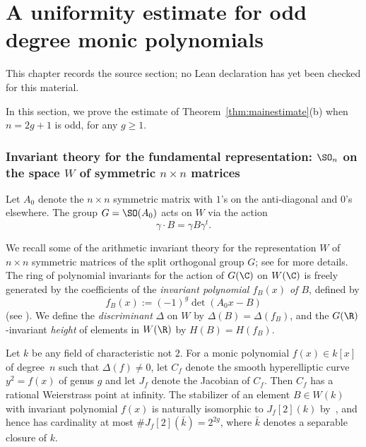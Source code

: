 \chapter{A uniformity estimate for odd degree monic polynomials}
\label{squarefree-values-polynomial-discriminants-chapter-02}

\begin{remark}
\label{squarefree-values-polynomial-discriminants-chapter-02-source}
This chapter records the source section; no Lean declaration has yet been checked for this material.
\notready
\end{remark}

\label{sec:monicodd}

In this section, we prove the estimate of
Theorem~\ref{thm:mainestimate}(b) when $n=2g+1$ is odd, for any $g\geq
1$.

\subsection{Invariant theory for the fundamental representation:
  $\SO_n$ on the space $W$ of symmetric $n\times n$ matrices}

Let $A_0$ denote the $n\times n$ symmetric matrix with $1$'s on the
anti-diagonal and $0$'s elsewhere. The group $G=\SO(A_0)$ acts on $W$
via the action
\begin{equation*}
\gamma\cdot B=\gamma B\gamma^t.
\end{equation*}

We recall some of the arithmetic invariant theory for the
representation $W$ of $n\times n$ symmetric matrices of the split
orthogonal group $G$; see \cite{BG2} for more details.  The ring of
polynomial invariants for the action of $G(\C)$ on $W(\C)$ is freely
generated by the coefficients of the {\it invariant polynomial
  $f_B(x)$ of $B$}, defined by $$f_B(x):=(-1)^{g}\det(A_0x-B)$$ (see
\cite[\S4]{AITBG}). We define the {\it discriminant} $\Delta$ on $W$
by $\Delta(B)=\Delta(f_B)$, and the $G(\R)$-invariant {\it height} of
elements in $W(\R)$ by $H(B)=H(f_B).$


Let $k$ be any field of characteristic not $2$.
For a monic polynomial $f(x)\in k[x]$ of degree~$n$ such that
$\Delta(f)\neq0$, let $C_f$ denote the smooth hyperelliptic curve
$y^2=f(x)$ of genus $g$ and let $J_f$ denote the Jacobian of
$C_f$. Then $C_f$ has a rational Weierstrass point at infinity.
The stabilizer of an element $B\in W(k)$ with invariant polynomial
$f(x)$ is naturally isomorphic to $J_f[2](k)$
by~\cite[Proposition~5.1]{BG2}, and hence has cardinality at most
$\#J_f[2](\bar k)=2^{2g}$, where $\bar k$ denotes a separable closure
of $k$.

